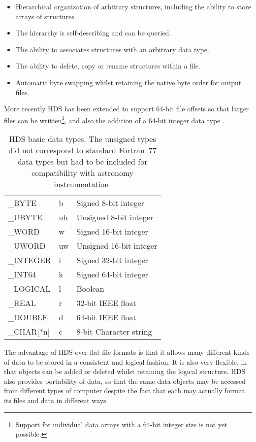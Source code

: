 \documentclass[final,authoryear,5p,times,twocolumn]{elsarticle}
\begin{document}
\begin{itemize}
\item Hierarchical organization of arbitrary structures, including the
  ability to store arrays of structures.
\item The hierarchy is self-describing and can be queried.
\item The ability to associates structures with an arbitrary data type.
\item The ability to delete, copy or rename structures within a file.
\item Automatic byte swapping whilst retaining the native byte order
  for output files.
\end{itemize}

More recently HDS has been extended to support 64-bit file offsets so
that larger files can be written\footnote{Support for individual data
  arrays with a 64-bit integer size is not yet possible.}, and also the
addition of a 64-bit integer data type \citep{P82_adassxxiii}.

\begin{table}
\caption{HDS basic data types. The unsigned types did not correspond
  to standard Fortran~77 data types but had to be included for
  compatibility with astronomy instrumentation.}
\label{tab:hdstypes}
\begin{center}
\begin{tabular}{lll}
\hline
\_BYTE & b & Signed 8-bit integer \\
\_UBYTE & ub & Unsigned 8-bit integer \\
\_WORD & w & Signed 16-bit integer \\
\_UWORD & uw & Unsigned 16-bit integer \\
\_INTEGER & i & Signed 32-bit integer \\
\_INT64 & k &Signed 64-bit integer \\
\_LOGICAL & l & Boolean \\
\_REAL & r & 32-bit IEEE float \\
\_DOUBLE & d & 64-bit IEEE float \\
\_CHAR[$*$n] & c & 8-bit Character string \\
\hline
\end{tabular}
\end{center}
\end{table}

The advantage of HDS over flat file formats is that it allows many different kinds of data to
be stored in a consistent and logical fashion. It is also very
flexible, in that objects can be added or deleted whilst retaining the
logical structure. HDS also provides portability of data, so that the
same data objects may be accessed from different types of computer
despite the fact that each may actually format its files and data in
different ways.
\end{document}
